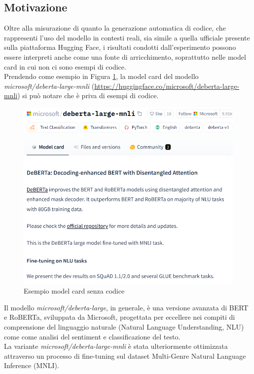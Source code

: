 \documentclass{article}
\begin{document}
\subsection{Motivazione} \label{motivation}
Oltre alla misurazione di quanto la generazione automatica di codice, che rappresenti l'uso del modello in contesti reali, sia simile a quella ufficiale presente sulla piattaforma Hugging Face, i risultati condotti dall'esperimento possono essere interpreti anche come una fonte di arricchimento, soprattutto nelle model card in cui non ci sono esempi di codice.\\
Prendendo come esempio in Figura \ref{fig:motivazione}, la model card del modello \textit{microsoft/deberta-large-mnli} (\url{https://huggingface.co/microsoft/deberta-large-mnli}) si può notare che è priva di esempi di codice.
\begin{figure}[htbp]
    \centering
    \includegraphics[width=\textwidth]{images/model_card_senza_codice.png}
    \caption{Esempio model card senza codice}
    \label{fig:motivazione}
\end{figure}
Il modello \textit{microsoft/deberta-large}, in generale, è una versione avanzata di BERT e RoBERTa, sviluppata da Microsoft, progettata per eccellere nei compiti di comprensione del linguaggio naturale (Natural Language Understanding, NLU) come come analisi del sentiment e classificazione del testo.\\ 
La variante \textit{microsoft/deberta-large-mnli} è stata ulteriormente ottimizzata attraverso un processo di fine-tuning sul dataset Multi-Genre Natural Language Inference (MNLI).\\
\end{document}

